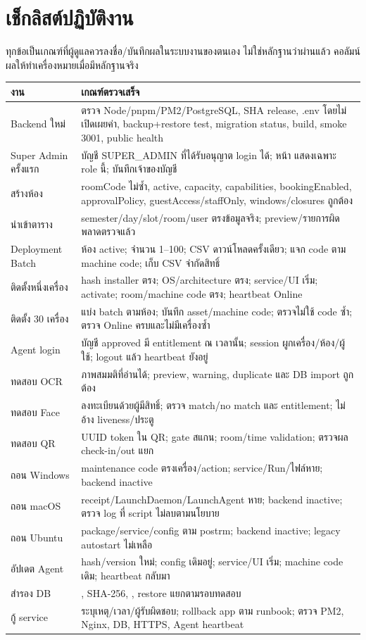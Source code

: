 \chapter{เช็กลิสต์ปฏิบัติงาน}
ทุกข้อเป็นเกณฑ์ที่ผู้ดูแลควรลงชื่อ/บันทึกผลในระบบงานของตนเอง ไม่ใช่หลักฐานว่าผ่านแล้ว คอลัมน์ผลให้ทำเครื่องหมายเมื่อมีหลักฐานจริง
\begin{longtable}{L{46mm}L{101mm}}
\toprule งาน & เกณฑ์ตรวจเสร็จ \\ \midrule\endhead
Backend ใหม่ & ตรวจ Node/pnpm/PM2/PostgreSQL, SHA release, .env โดยไม่เปิดเผยค่า, backup+restore test, migration status, build, smoke 3001, public health \\
Super Admin ครั้งแรก & บัญชี SUPER\_ADMIN ที่ได้รับอนุญาต login ได้; หน้า  แสดงเฉพาะ role นี้; บันทึกเจ้าของบัญชี \\
สร้างห้อง & roomCode ไม่ซ้ำ, active, capacity, capabilities, bookingEnabled, approvalPolicy, guestAccess/staffOnly, windows/closures ถูกต้อง \\
นำเข้าตาราง & semester/day/slot/room/user ตรงข้อมูลจริง; preview/รายการผิดพลาดตรวจแล้ว \\
Deployment Batch & ห้อง active; จำนวน 1--100; CSV ดาวน์โหลดครั้งเดียว; แจก code ตาม machine code; เก็บ CSV จำกัดสิทธิ์ \\
ติดตั้งหนึ่งเครื่อง & hash installer ตรง; OS/architecture ตรง; service/UI เริ่ม; activate; room/machine code ตรง; heartbeat Online \\
ติดตั้ง 30 เครื่อง & แบ่ง batch ตามห้อง; บันทึก asset/machine code; ตรวจไม่ใช้ code ซ้ำ; ตรวจ Online ครบและไม่มีเครื่องซ้ำ \\
Agent login & บัญชี approved มี entitlement ณ เวลานั้น; session ผูกเครื่อง/ห้อง/ผู้ใช้; logout แล้ว heartbeat ยังอยู่ \\
ทดสอบ OCR & ภาพสมมติที่อ่านได้; preview, warning, duplicate และ DB import ถูกต้อง \\
ทดสอบ Face & ลงทะเบียนด้วยผู้มีสิทธิ์; ตรวจ match/no match และ entitlement; ไม่อ้าง liveness/ประตู \\
ทดสอบ QR & UUID token ใน QR; gate สแกน; room/time validation; ตรวจผล check-in/out แยก \\
ถอน Windows & maintenance code ตรงเครื่อง/action; service/Run/ไฟล์หาย; backend inactive \\
ถอน macOS & receipt/LaunchDaemon/LaunchAgent หาย; backend inactive; ตรวจ log ที่ script ไม่ลบตามนโยบาย \\
ถอน Ubuntu & package/service/config ตาม postrm; backend inactive; legacy autostart ไม่เหลือ \\
อัปเดต Agent & hash/version ใหม่; config เดิมอยู่; service/UI เริ่ม; machine code เดิม; heartbeat กลับมา \\
สำรอง DB & , SHA-256, , restore แยกตามรอบทดสอบ \\
กู้ service & ระบุเหตุ/เวลา/ผู้รับผิดชอบ; rollback app ตาม runbook; ตรวจ PM2, Nginx, DB, HTTPS, Agent heartbeat \\
\bottomrule
\end{longtable}

